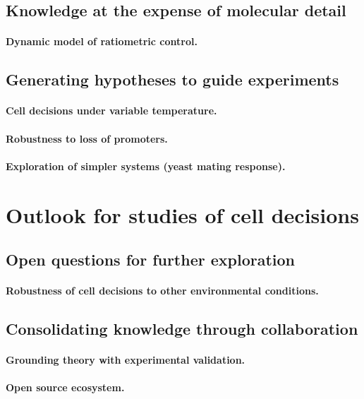 	\subsection{Knowledge at the expense of molecular detail}
		\paragraph{Dynamic model of ratiometric control.}		
		
	\subsection{Generating hypotheses to guide experiments}
		\paragraph{Cell decisions under variable temperature.}		
		\paragraph{Robustness to loss of promoters.}
		\paragraph{Exploration of simpler systems (yeast mating response).}
		
\section{Outlook for studies of cell decisions}

	\subsection{Open questions for further exploration}
		\paragraph{Robustness of cell decisions to other environmental conditions.}	
					
	\subsection{Consolidating knowledge through collaboration}
	
		\paragraph{Grounding theory with experimental validation.}		
		\paragraph{Open source ecosystem.}